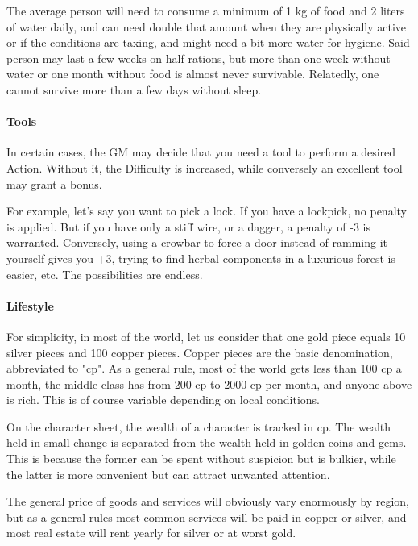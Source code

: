 The average person will need to consume a minimum of 1 kg of food and 2 liters of water daily, and can need double that amount when they are physically active or if the conditions are taxing, and might need a bit more water for hygiene. Said person may last a few weeks on half rations, but more than one week without water or one month without food is almost never survivable. Relatedly, one cannot survive more than a few days without sleep.


\paragraph{Tools}

In certain cases, the GM may decide that you need a tool to perform a desired Action. Without it, the Difficulty is increased, while conversely an excellent tool may grant a bonus. 

For example, let's say you want to pick a lock. If you have a lockpick, no penalty is applied. But if you have only a stiff wire, or a dagger, a penalty of -3 is warranted. Conversely, using a crowbar to force a door instead of ramming it yourself gives you +3, trying to find herbal components in a luxurious forest is easier, etc. The possibilities are endless.


\paragraph{Lifestyle} 

For simplicity, in most of the world, let us consider that one gold piece equals 10 silver pieces and 100 copper pieces. Copper pieces are the basic denomination, abbreviated to "cp". As a general rule, most of the world gets less than 100 cp a month, the middle class has from 200 cp to 2000 cp per month, and anyone above is rich. This is of course variable depending on local conditions.

On the character sheet, the wealth of a character is tracked in cp. The wealth held in small change is separated from the wealth held in golden coins and gems. This is because the former can be spent without suspicion but is bulkier, while the latter is more convenient but can attract unwanted attention.

The general price of goods and services will obviously vary enormously by region, but as a general rules most common services will be paid in copper or silver, and most real estate will rent yearly for silver or at worst gold.

